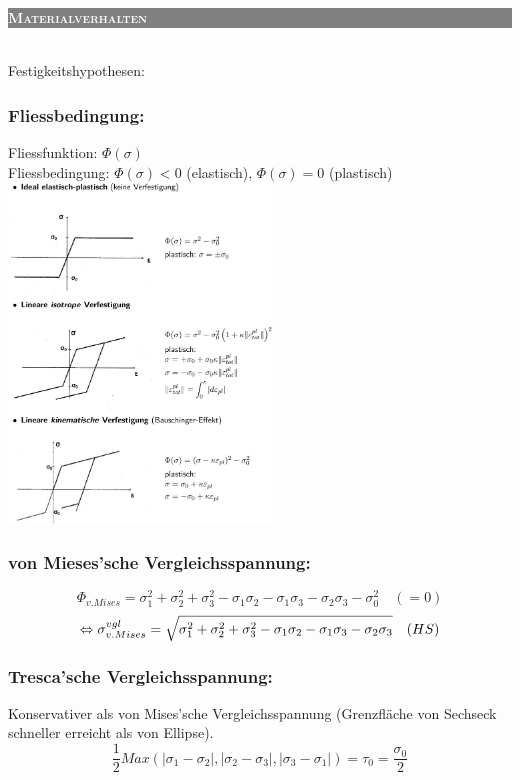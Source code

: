 \documentclass[a4paper,10pt]{article}
\newcommand{\uone}[2]{\colorbox{gray}{\textcolor{white}{\parbox{\linewidth-2.4}{\scshape{\medium\textbf{#1}} }}}\\}
\begin{document}
\begin{multicols}{3}
\uone{Materialverhalten}
    \subsection{Festigkeitshypothesen:}
        \subsubsection{Fliessbedingung:}
            Fliessfunktion: $\Phi(\sigma)$\\
            Fliessbedingung: $\Phi(\sigma)<0$ (elastisch), $\Phi(\sigma)=0$ (plastisch)
            \includegraphics[width=70mm]{images/Fliessbedingungen.jpeg}
        \subsubsection{von Mieses'sche Vergleichsspannung:}
            \[\Phi_{v.Mises}= \sigma_1^2+\sigma_2^2+\sigma_3^2-\sigma_1\sigma_2-\sigma_1\sigma_3-\sigma_2\sigma_3 -\sigma_0^2\quad(=0)\]
            \[\Leftrightarrow \sigma_{v. Mises}^{vgl}= \sqrt{\sigma_1^2+\sigma_2^2+\sigma_3^2-\sigma_1\sigma_2-\sigma_1\sigma_3-\sigma_2\sigma_3} \quad\textrm(HS)\]
        \subsubsection{Tresca'sche Vergleichsspannung:}
            Konservativer als von Mises'sche Vergleichsspannung (Grenzfläche von Sechseck schneller erreicht als von Ellipse).
            \[\frac{1}{2}Max(|\sigma_1-\sigma_2|,|\sigma_2-\sigma_3|,|\sigma_3-\sigma_1|)=\tau_0=\frac{\sigma_0}{2}\]

\end{multicols}
\end{document}
